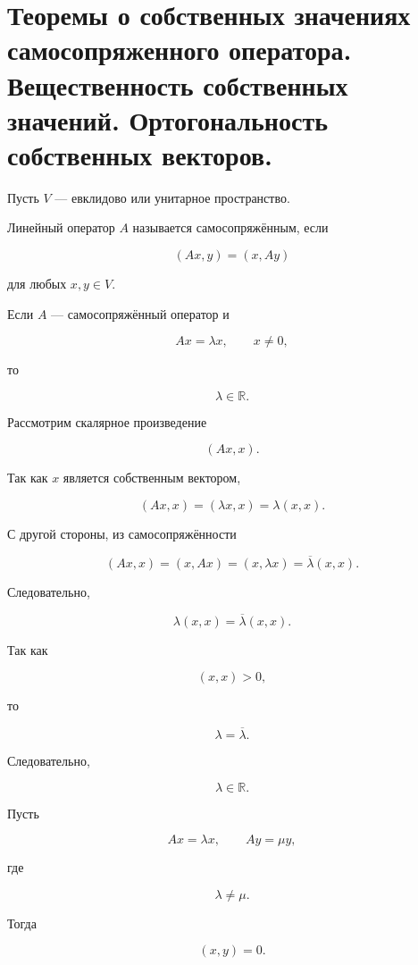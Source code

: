 \documentclass[14pt]{extreport}
\begin{document}
\chapter{Теоремы о собственных значениях самосопряженного оператора. Вещественность собственных значений. Ортогональность собственных векторов.}

\begin{defbox}
Пусть \(V\) --- евклидово или унитарное пространство.

Линейный оператор \(A\) называется самосопряжённым, если

\[
(Ax,y)=(x,Ay)
\]

для любых \(x,y\in V\).

\end{defbox}

\begin{thbox}

Если \(A\) --- самосопряжённый оператор и

\[
Ax=\lambda x,
\qquad x\neq0,
\]

то

\[
\lambda\in\mathbb R.
\]
\end{thbox}

\begin{prbox}

Рассмотрим скалярное произведение

\[
(Ax,x).
\]

Так как \(x\) является собственным вектором,

\[
(Ax,x)
=
(\lambda x,x)
=
\lambda(x,x).
\]

С другой стороны, из самосопряжённости

\[
(Ax,x)
=
(x,Ax)
=
(x,\lambda x)
=
\overline{\lambda}(x,x).
\]

Следовательно,

\[
\lambda(x,x)
=
\overline{\lambda}(x,x).
\]

Так как

\[
(x,x)>0,
\]

то

\[
\lambda=\overline{\lambda}.
\]

Следовательно,

\[
\lambda\in\mathbb R.
\]

\end{prbox}

\begin{thbox}

Пусть

\[
Ax=\lambda x,
\qquad
Ay=\mu y,
\]

где

\[
\lambda\neq\mu.
\]

Тогда

\[
(x,y)=0.
\]

\end{thbox}
\end{document}
